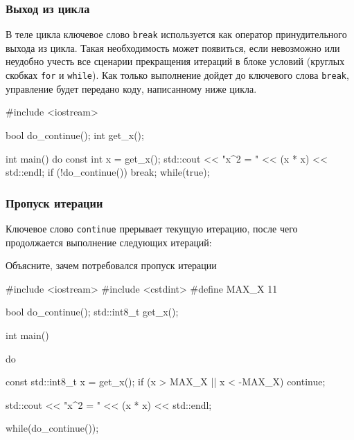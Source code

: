 \documentclass[compress, 8pt, aspectratio=169]{beamer}
\begin{document}
\begin{frame}[fragile]

    \frametitle{Выход из цикла}

    \hfill \break

    В теле цикла ключевое слово \verb|break| используется как оператор
    принудительного выхода из цикла.
    Такая необходимость может появиться, если невозможно или
    неудобно учесть все сценарии прекращения итераций в блоке условий
    (круглых скобках \verb|for| и \verb|while|).
    Как только выполнение дойдет до ключевого слова \verb|break|,
    управление будет передано коду, написанному ниже цикла.

    \begin{myinplacelisting}[minted language=cpp]
#include <iostream>

bool do_continue();
int get_x();

int main() {
    do {
        const int x = get_x();
        std::cout << "x^2 = " << (x * x) << std::endl;
        if (!do_continue()) {
            break;
        }
    } while(true);
}
    \end{myinplacelisting}
\end{frame}

\begin{frame}[fragile]

    \frametitle{Пропуск итерации}

    \hfill \break

    Ключевое слово \verb|continue| прерывает текущую итерацию,
    после чего продолжается выполнение следующих итераций:

    \begin{task}
        Объясните, зачем потребовался пропуск итерации
    \end{task}

    \begin{myinplacelisting}[%
        minted language=cpp,
        minted options={
            fontsize=\footnotesize,
            breaklines,
            breakanywhere,
            linenos,
            escapeinside=??,
            numbersep=2pt
        },
    ]
#include <iostream>
#include <cstdint>
#define MAX_X 11

bool do_continue();
std::int8_t get_x();

int main() {
    do {
        const std::int8_t x = get_x();
        if (x > MAX_X || x < -MAX_X) {
            continue;
        }

        std::cout << "x^2 = " << (x * x) << std::endl;
    } while(do_continue());
}
    \end{myinplacelisting}

\end{frame}
\end{document}
